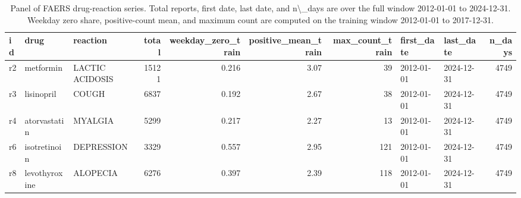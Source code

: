 \begin{table}

\caption{Panel of FAERS drug-reaction series. Total reports, first date, last date, and n\textbackslash{}\_days are over the full window 2012-01-01 to 2024-12-31. Weekday zero share, positive-count mean, and maximum count are computed on the training window 2012-01-01 to 2017-12-31.}
\centering
\begin{tabular}[t]{lllrrrrllr}
\toprule
id & drug & reaction & total & weekday\_zero\_train & positive\_mean\_train & max\_count\_train & first\_date & last\_date & n\_days\\
\midrule
r2 & metformin & LACTIC ACIDOSIS & 15121 & 0.216 & 3.07 & 39 & 2012-01-01 & 2024-12-31 & 4749\\
r3 & lisinopril & COUGH & 6837 & 0.192 & 2.67 & 38 & 2012-01-01 & 2024-12-31 & 4749\\
r4 & atorvastatin & MYALGIA & 5299 & 0.217 & 2.27 & 13 & 2012-01-01 & 2024-12-31 & 4749\\
r6 & isotretinoin & DEPRESSION & 3329 & 0.557 & 2.95 & 121 & 2012-01-01 & 2024-12-31 & 4749\\
r8 & levothyroxine & ALOPECIA & 6276 & 0.397 & 2.39 & 118 & 2012-01-01 & 2024-12-31 & 4749\\
\bottomrule
\end{tabular}
\end{table}
